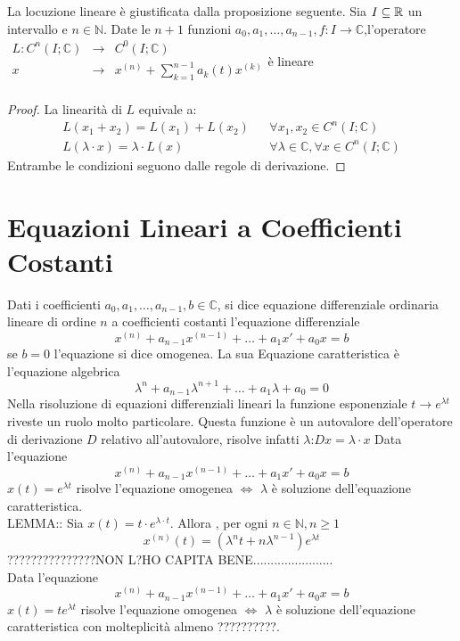 \observation
La locuzione lineare è giustificata dalla proposizione seguente.
\proposition
Sia $I\subseteq \mathbb{R}$ un intervallo e $n\in\mathbb{N}$. Date le $n+1$ funzioni $a_0,a_1,\ldots,a_{n-1},f:I\to\mathbb{C}$,l'operatore 
$\begin{array}{rcl} 
L: C^n(I;\mathbb{C}) & \to & C^0(I;\mathbb{C}) \\
x & \to & x^{(n)}+\sum\limits_{k=1}^{n-1}a_k(t)x^{(k)} \\ 
\end{array}$è lineare
\begin{proof}
	La linearità di $L$ equivale a:
	$$ \begin{matrix}L(x_1+x_2)=L(x_1)+L(x_2) && \forall x_1,x_2\in C^n(I;\mathbb{C})\\L(\lambda\cdot x)=\lambda\cdot L(x) && \forall\lambda\in\mathbb{C}, \forall x\in C^n(I;\mathbb{C})\end{matrix} $$
	Entrambe le condizioni  seguono dalle regole di derivazione.
\end{proof}
\section{Equazioni Lineari a Coefficienti Costanti}
Dati i coefficienti $a_0,a_1,\ldots,a_{n-1},b\in\mathbb{C}$, si dice equazione differenziale ordinaria lineare di ordine $n$ a coefficienti costanti l'equazione differenziale
$$x^{(n)}+a_{n-1}x^{(n-1)}+\ldots+a_1 x'+a_0x=b$$
se $b=0$ l'equazione si dice omogenea. La sua Equazione caratteristica è l'equazione algebrica
$$\lambda^n+a_{n-1}\lambda^{n+1}+\ldots+a_1\lambda+a_0=0$$ 
\observation
Nella risoluzione di equazioni differenziali lineari la funzione esponenziale $t\to e^{\lambda t}$ riveste un ruolo molto particolare. Questa funzione è un autovalore dell'operatore di derivazione $D$ relativo all'autovalore, risolve infatti $\lambda$:$Dx=\lambda\cdot x$ 
\proposition
Data l'equazione
$$x^{(n)}+a_{n-1}x^{(n-1)}+\ldots+a_1 x'+a_0x=b$$
$x(t)=e^{\lambda t}$ risolve l'equazione omogenea $\Leftrightarrow$ $\lambda$ è soluzione dell'equazione caratteristica.\\

LEMMA:: Sia $x(t)=t\cdot e^{\lambda\cdot t}$. Allora , per ogni $n\in\mathbb{N}, n\ge 1$
$$x^{(n)}(t)=\left(\lambda^nt+n\lambda^{n-1}\right)e^{\lambda t}$$
???????????????NON L?HO CAPITA BENE.......................\\
\proposition
Data l'equazione 
$$x^{(n)}+a_{n-1}x^{(n-1)}+\ldots+a_1 x'+a_0x=b$$
$x(t)=te^{\lambda t}$ risolve l'equazione omogenea $\Leftrightarrow$ $\lambda$ è soluzione dell'equazione caratteristica con molteplicità almeno ??????????.






